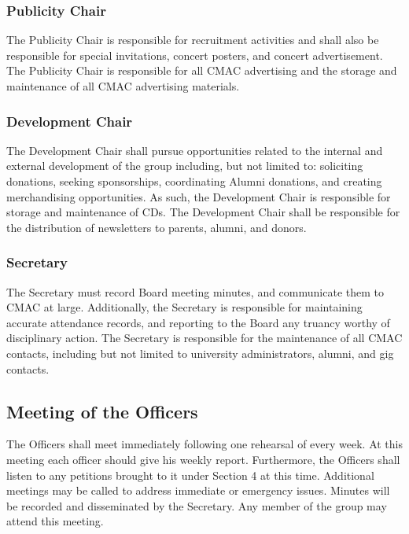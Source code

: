 \documentclass{article}
\begin{document}
\subsubsection{Publicity Chair}

The Publicity Chair is responsible for recruitment activities and shall also be
responsible for special invitations, concert posters, and concert
advertisement. The Publicity Chair is responsible for all CMAC advertising and
the storage and maintenance of all CMAC advertising materials.

\subsubsection{Development Chair}

The Development Chair shall pursue opportunities related to the internal
and external development of the group including, but not limited to:
soliciting donations, seeking sponsorships, coordinating Alumni donations, and
creating merchandising opportunities. As such, the Development Chair is
responsible for storage and maintenance of CDs. The Development
Chair shall be responsible for the distribution of newsletters to
parents, alumni, and donors.

\subsubsection{Secretary}

The Secretary must record Board meeting minutes, and communicate them to CMAC at
large. Additionally, the Secretary is responsible for maintaining accurate
attendance records, and reporting to the Board any truancy worthy of
disciplinary action. The Secretary is responsible for the maintenance of all
CMAC contacts, including but not limited to university administrators, alumni,
and gig contacts.

\subsection{Meeting of the Officers}

The Officers shall meet immediately following one rehearsal of every
week. At this meeting each officer should give his weekly report.
Furthermore, the Officers shall listen to any petitions brought to
it under Section 4 at this time. Additional meetings may be called
to address immediate or emergency issues. Minutes will be recorded
and disseminated by the Secretary. Any member of the group may attend
this meeting.
\end{document}
